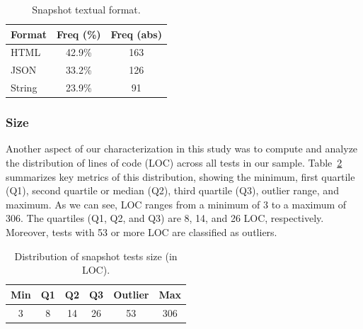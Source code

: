 \documentclass[
	msc, %
	english %
]{../ppgccufmg}
\begin{document}
        \hspace{1pt}
        \begin{table}[!ht]
            \centering
            \begin{tabular}{p{5cm}S[table-format=2.1]S[table-format=3]}
                \toprule
                \textbf{Format} & {\textbf{Freq (\%)}} & {\textbf{Freq (abs)}} \\
                \midrule
                HTML   & 42.9\% & 163 \\
                JSON   & 33.2\% & 126 \\
                String & 23.9\% & 91  \\
                \bottomrule
            \end{tabular}
            \caption{Snapshot textual format.}
            \label{tab:snapshot_textual_format}
        \end{table}


        \subsubsection{Size}
         
        Another aspect of our characterization in this study was to compute and analyze the distribution of lines of code (LOC) across all tests in our sample. Table~\ref{tab:statistical_summary} summarizes key metrics of this distribution, showing the minimum, first quartile (Q1), second quartile or median (Q2), third quartile (Q3), outlier range, and maximum. As we can see, LOC ranges from a minimum of 3 to a maximum of 306. The quartiles (Q1, Q2, and Q3) are 8, 14, and 26 LOC, respectively. Moreover, tests with 53 or more LOC are classified as outliers.

        \hspace{1pt}
        \begin{table}[!ht]
        \centering
        \begin{tabular}{cccccc}
            \toprule
            \textbf{Min} & \textbf{Q1} & \textbf{Q2} & \textbf{Q3} & \textbf{Outlier} & \textbf{Max} \\
            \midrule
            3 & 8 & 14 & 26 & 53 & 306 \\
            \bottomrule
        \end{tabular}
        \caption{Distribution of snapshot tests size (in LOC).}
        \label{tab:statistical_summary}
        \end{table}
\end{document}
